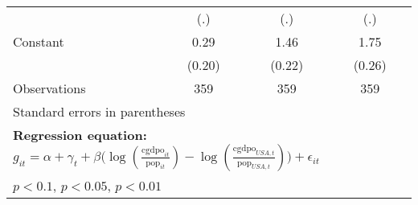 \begin{table}[htbp]
\begin{tabular}{l*{3}{c}}
                &      (.)         &      (.)         &      (.)         \\
\addlinespace
Constant        &     0.29         &     1.46\sym{***}&     1.75\sym{***}\\
                &   (0.20)         &   (0.22)         &   (0.26)         \\
\midrule
Observations    &      359         &      359         &      359         \\
\bottomrule
\multicolumn{4}{l}{\footnotesize Standard errors in parentheses}\\
\multicolumn{4}{l}{\footnotesize \textbf{Regression equation:} \(g_{it} = \alpha + \gamma_t + \beta \big(\log (\frac{\textrm{cgdpo}_{it}}{\textrm{pop}_{it}} ) - \log (\frac{\textrm{cgdpo}_{USA,t}}{\textrm{pop}_{USA,t}}  ) \big) + \epsilon_{it}\)}\\
\multicolumn{4}{l}{\footnotesize \sym{*} \(p<0.1\), \sym{**} \(p<0.05\), \sym{***} \(p<0.01\)}\\
\end{tabular}
\end{table}
